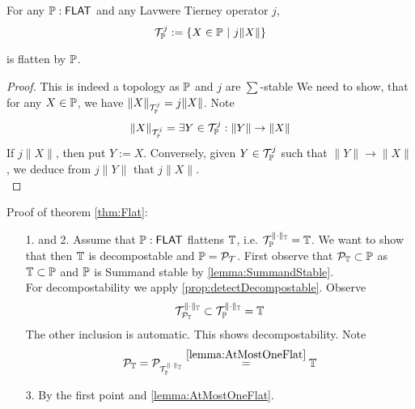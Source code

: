 %
\begin{lemma}{\label{lemma:AtMostOneFlat}}
		For any $\mathbb{P} : \mathsf{FLAT}$ and any Lavwere Tierney operator $j$,
	\[\mathcal{T}^j_{\mathbb{P}} := \{ X \in \mathbb{P} \ | \ j \|X \| \}	 \]
	
	is flatten by $\mathbb{P}$.
\end{lemma}
\begin{proof}

				This is indeed a topology as $\mathbb{P}$ and $j$ are $\sum$-stable %
			We need to show, that for any $X \in \mathbb{P}$, we have $\|X\|_{\mathcal{T}^j_{\mathbb{P}}} = j\|X\|$.
			Note
			\[
			\|X\|_{\mathcal{T}^j_{\mathbb{P}}} = \exists Y \in \mathcal{T}^j_{\mathbb{P}} : \|Y\| \to \|X\|
			\]
			If $j\|X\|$, then put $Y := X$. Conversely, given $Y \in \mathcal{T}^j_{\mathbb{P}}$ such that $\|Y\| \to \|X\|$, we deduce from $j \|Y\|$ that $j\|X\|$. \\
\end{proof}
Proof of theorem \ref{thm:Flat}:
\begin{enumerate}
	\item [1. and 2.] 	Assume that $\mathbb{P} : \mathsf{FLAT}$ flattens $\mathbb{T}$, i.e. $\mathcal{T}_{\mathbb{P}}^{\|\cdot\|_{\mathbb{T}}}  = \mathbb{T}$. We want to show that then $\mathbb{T}$ is decompostable and $\mathbb{P}= \mathcal{P}_{\mathcal{T}}$. 
	First observe that $\mathcal{P}_{\mathbb{T}} \subset \mathbb{P}$ as $\mathbb{T} \subset \mathbb{P}$ and $\mathbb{P}$ is Summand stable by \ref{lemma:SummandStable}. \\
	For decompostability we apply \ref{prop:detectDecompostable}.
	Observe
	\[\mathcal{T}_{\mathcal{P}_{\mathbb{T}}}^{\|\cdot\|_{\mathbb{T}}} \subset \mathcal{T}_{\mathbb{P}}^{\|\cdot\|_{\mathbb{T}}} = \mathbb{T} \]
	The other inclusion is automatic. This shows decompostability.
	Note
	\[
	\mathcal{P}_{\mathbb{T}} = \mathcal{P}_{\mathcal{T}_{\mathbb{P}}^{\|\cdot\|_{\mathbb{T}}}} \overset{\ref{lemma:AtMostOneFlat}}{=} \mathbb{T}
	\]
	\item [3.] By the first point and \ref{lemma:AtMostOneFlat}.
\end{enumerate}




